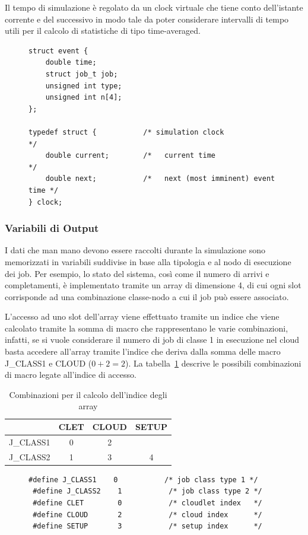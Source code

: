 Il tempo di simulazione è regolato da un clock virtuale che tiene conto
dell’istante corrente e del successivo in modo tale da poter considerare
intervalli di tempo utili per il calcolo di statistiche di tipo time-averaged.

\begin{figure}[!h]
\begin{lstlisting}[title=Impementazione Evento e Clock Virtuale (basic.h)]
struct event {
    double time;
    struct job_t job;
    unsigned int type;
    unsigned int n[4];
};

typedef struct {           /* simulation clock                  */
    double current;        /*   current time                    */
    double next;           /*   next (most imminent) event time */
} clock;
\end{lstlisting}
\end{figure}

%
\subsubsection{Variabili di Output}
I dati che man mano devono essere raccolti durante la simulazione sono
memorizzati in variabili suddivise in base alla tipologia e al nodo di
esecuzione dei job. Per esempio, lo stato del sistema, così come il numero di
arrivi e completamenti, è implementato tramite un array di dimensione 4, di cui
ogni slot corrisponde ad una combinazione classe-nodo a cui il job può essere
associato. 

L’accesso ad uno slot dell’array viene effettuato tramite un indice
che viene calcolato tramite la somma di macro che rappresentano le varie
combinazioni, infatti, se si vuole considerare il numero di job di classe 1 in
esecuzione nel cloud basta accedere all’array tramite l’indice che deriva dalla
somma delle macro J\_CLASS1 e CLOUD ($0 + 2 = 2$). La tabella~\ref{comb}
descrive le possibili combinazioni di macro legate all’indice di accesso.
\begin{table}[!h]
\begin{tabular}{c|c|c|c}
          & CLET & CLOUD & SETUP \\
\hline
J\_CLASS1 & 0    & 2     &       \\
\hline
J\_CLASS2 & 1    & 3     & 4     \\
\end{tabular}
\centering
\caption{Combinazioni per il calcolo dell'indice degli array}
\label{comb}
\end{table}
%
\begin{figure}[!h]
\begin{lstlisting}[title=Definizione macro Nodi e Classi (basic.h)]
 #define J_CLASS1    0           /* job class type 1 */
 #define J_CLASS2    1           /* job class type 2 */
 #define CLET        0           /* cloudlet index   */
 #define CLOUD       2           /* cloud index      */
 #define SETUP       3           /* setup index      */
\end{lstlisting}
\end{figure}
